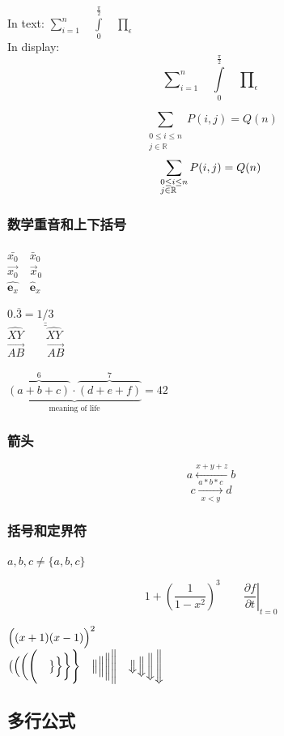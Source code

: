 \documentclass[12pt,UTF8]{ctexart}%
\begin{document}
In text:
$\sum\limits_{i=1}^n \quad
\int\limits_0^{\frac{\pi}{2}} \quad
\prod\limits_\epsilon $ \\
In display:
\[\sum\nolimits_{i=1}^n \quad
\int\limits_0^{\frac{\pi}{2}} \quad
\prod\nolimits_\epsilon \]


\[
\sum_{\substack{0\le i\le n \\
j\in \mathbb{R}}}
P(i,j) = Q(n)
\]
\[
\sum_{\begin{subarray}{l}
0\le i\le n \\
j\in \mathbb{R}
\end{subarray}}
P(i,j) = Q(n)
\]


\subsubsection{数学重音和上下括号}

$\bar{x_0} \quad \bar{x}_0$\\[5pt]
$\vec{x_0} \quad \vec{x}_0$\\[5pt]
$\hat{\mathbf{e}_x} \quad
\hat{\mathbf{e}}_x$


$0.\overline{3} =
\underline{\underline{1/3}}$ \\[5pt]
$\hat{XY} \qquad \widehat{XY}$\\[5pt]
$\vec{AB} \qquad
\overrightarrow{AB}$

$\underbrace{\overbrace{(a+b+c)}^6
\cdot \overbrace{(d+e+f)}^7}
_\text{meaning of life} = 42$


\subsubsection{箭头}

\[ a\xleftarrow{x+y+z} b \]
\[ c\xrightarrow[x<y]{a*b*c}d \]


\subsubsection{括号和定界符}

${a,b,c} \neq \{a,b,c\}$

\[1 + \left(\frac{1}{1-x^{2}}
\right)^3 \qquad
\left.\frac{\partial f}{\partial t}
\right|_{t=0}\]


$\Bigl((x+1)(x-1)\Bigr)^{2}$\\
$\bigl( \Bigl( \biggl( \Biggl( \quad
\bigr\} \Bigr\} \biggr\} \Biggr\} \quad
\big\| \Big\| \bigg\| \Bigg\| \quad
\big\Downarrow \Big\Downarrow
\bigg\Downarrow \Bigg\Downarrow$


\subsection{多行公式}
\end{document}
